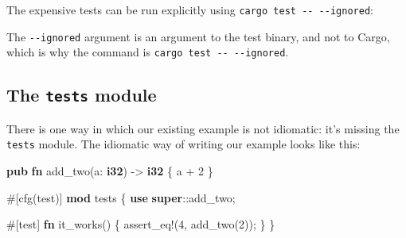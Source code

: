 \documentclass[a4paper,]{book}
\newenvironment{Shaded}{\begin{snugshade}}{\end{snugshade}}
\newcommand{\KeywordTok}[1]{\textcolor[rgb]{0.13,0.29,0.53}{\textbf{{#1}}}}
\newcommand{\DecValTok}[1]{\textcolor[rgb]{0.00,0.00,0.81}{{#1}}}
\newcommand{\OtherTok}[1]{\textcolor[rgb]{0.56,0.35,0.01}{{#1}}}
\newcommand{\NormalTok}[1]{{#1}}
\begin{document}
The expensive tests can be run explicitly using
\texttt{cargo\ test\ -\/-\ -\/-ignored}:

\begin{Shaded}
\end{Shaded}

The \texttt{-\/-ignored} argument is an argument to the test binary, and
not to Cargo, which is why the command is
\texttt{cargo\ test\ -\/-\ -\/-ignored}.

\subsection{\texorpdfstring{The \texttt{tests}
module}{The tests module}}\label{the-tests-module}

There is one way in which our existing example is not idiomatic: it's
missing the \texttt{tests} module. The idiomatic way of writing our
example looks like this:

\begin{Shaded}
\begin{Highlighting}[]
\KeywordTok{pub} \KeywordTok{fn} \NormalTok{add_two(a: }\KeywordTok{i32}\NormalTok{) -> }\KeywordTok{i32} \NormalTok{\{}
    \NormalTok{a + }\DecValTok{2}
\NormalTok{\}}

\OtherTok{#[}\NormalTok{cfg}\OtherTok{(}\NormalTok{test}\OtherTok{)]}
\KeywordTok{mod} \NormalTok{tests \{}
    \KeywordTok{use} \KeywordTok{super}\NormalTok{::add_two;}

    \OtherTok{#[}\NormalTok{test}\OtherTok{]}
    \KeywordTok{fn} \NormalTok{it_works() \{}
        \OtherTok{assert_eq!}\NormalTok{(}\DecValTok{4}\NormalTok{, add_two(}\DecValTok{2}\NormalTok{));}
    \NormalTok{\}}
\NormalTok{\}}
\end{Highlighting}
\end{Shaded}
\end{document}
